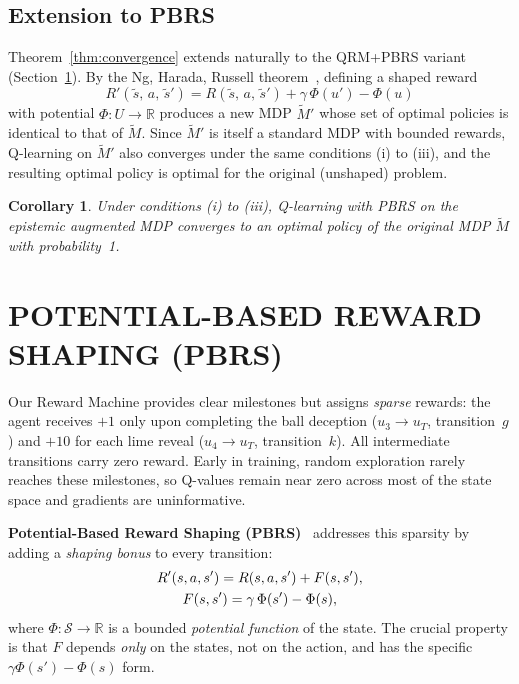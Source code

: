 \documentclass[letterpaper, 10 pt, conference]{ieeeconf}  %
\newtheorem{corollary}[theorem]{Corollary}
\begin{document}
\subsection{Extension to PBRS}

Theorem~\ref{thm:convergence} extends naturally to the QRM+PBRS variant (Section~\ref{sec:pbrs}).
By the Ng, Harada, Russell theorem~\cite{ng1999}, defining a shaped reward
\[
    R'(\tilde{s},\, a,\, \tilde{s}') = R(\tilde{s},\, a,\, \tilde{s}') + \gamma\,\Phi(u') - \Phi(u)
\]
with potential $\Phi : U \to \mathbb{R}$ produces a new MDP $\tilde{M}'$ whose set of optimal policies is identical to that of $\tilde{M}$.  Since $\tilde{M}'$ is itself a standard MDP with bounded rewards, Q-learning on $\tilde{M}'$ also converges under the same conditions (i) to (iii), and the resulting optimal policy is optimal for the original (unshaped) problem.

\begin{corollary}
Under conditions (i) to (iii), Q-learning with PBRS on the epistemic augmented MDP converges to an optimal policy of the original MDP $\tilde{M}$ with probability~1.
\end{corollary}

\section{POTENTIAL-BASED REWARD SHAPING (PBRS)}
\label{sec:pbrs}

Our Reward Machine provides clear milestones but assigns \emph{sparse} rewards: the agent receives $+1$ only upon completing the ball deception ($u_3 \!\to\! u_T$, transition~$g$) and $+10$ for each lime reveal ($u_4 \!\to\! u_T$, transition~$k$).
All intermediate transitions carry zero reward.
Early in training, random exploration rarely reaches these milestones, so Q-values remain near zero across most of the state space and gradients are uninformative.

\textbf{Potential-Based Reward Shaping (PBRS)}~\cite{ng1999} addresses this sparsity by adding a \emph{shaping bonus} to every transition:
\begin{gather}
\label{eq:shaping}
R'(s, a, s') = R(s, a, s') + F(s, s'),\notag\\
F(s, s') = \gamma\,\Phi(s') - \Phi(s),
\end{gather}
where $\Phi : \mathcal{S} \to \mathbb{R}$ is a bounded \emph{potential function} of the state.
The crucial property is that $F$ depends \emph{only} on the states, not on the action, and has the specific $\gamma\Phi(s') - \Phi(s)$ form.
\end{document}
